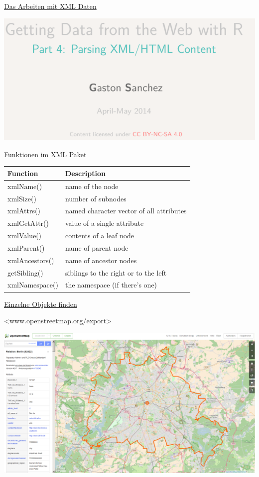 \documentclass[ignorenonframetext,]{beamer}
\begin{document}
\begin{frame}{\href{https://github.com/gastonstat/tutorial-R-web-data/blob/master/04-parsing-xml/04-parsing-xml.pdf}{Das
Arbeiten mit XML Daten}}
\protect\hypertarget{das-arbeiten-mit-xml-daten}{}

\includegraphics{figure/GastonSanchez3.PNG}

\end{frame}

\begin{frame}{Funktionen im XML Paket}
\protect\hypertarget{funktionen-im-xml-paket}{}

\begin{longtable}[]{@{}ll@{}}
\toprule
Function & Description\tabularnewline
\midrule
\endhead
xmlName() & name of the node\tabularnewline
xmlSize() & number of subnodes\tabularnewline
xmlAttrs() & named character vector of all attributes\tabularnewline
xmlGetAttr() & value of a single attribute\tabularnewline
xmlValue() & contents of a leaf node\tabularnewline
xmlParent() & name of parent node\tabularnewline
xmlAncestors() & name of ancestor nodes\tabularnewline
getSibling() & siblings to the right or to the left\tabularnewline
xmlNamespace() & the namespace (if there's one)\tabularnewline
\bottomrule
\end{longtable}

\end{frame}

\begin{frame}{\href{http://www.openstreetmap.org/export}{Einzelne
Objekte finden}}
\protect\hypertarget{einzelne-objekte-finden}{}

\textless{}www.openstreetmap.org/export\textgreater{}

\includegraphics{figure/admgrBer.PNG}

\end{frame}
\end{document}
